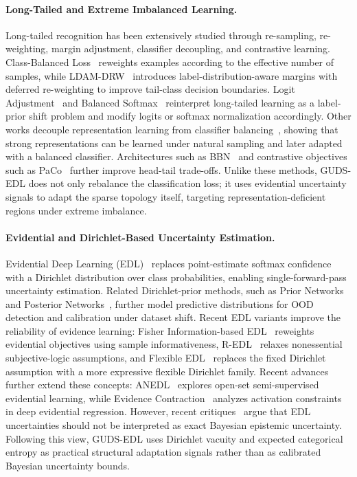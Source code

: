 \documentclass[letterpaper]{article} %
\begin{document}
\paragraph{Long-Tailed and Extreme Imbalanced Learning.} Long-tailed recognition has been extensively studied through re-sampling, re-weighting, margin adjustment, classifier decoupling, and contrastive learning. Class-Balanced Loss~\cite{cui2019class} reweights examples according to the effective number of samples, while LDAM-DRW~\cite{cao2019learning} introduces label-distribution-aware margins with deferred re-weighting to improve tail-class decision boundaries. Logit Adjustment~\cite{menon2021long} and Balanced Softmax~\cite{ren2020balanced} reinterpret long-tailed learning as a label-prior shift problem and modify logits or softmax normalization accordingly. Other works decouple representation learning from classifier balancing~\cite{kang2019decoupling}, showing that strong representations can be learned under natural sampling and later adapted with a balanced classifier. Architectures such as BBN~\cite{zhou2020bbn} and contrastive objectives such as PaCo~\cite{cui2021parametric} further improve head-tail trade-offs. Unlike these methods, GUDS-EDL does not only rebalance the classification loss; it uses evidential uncertainty signals to adapt the sparse topology itself, targeting representation-deficient regions under extreme imbalance.

\paragraph{Evidential and Dirichlet-Based Uncertainty Estimation.} Evidential Deep Learning (EDL)~\cite{sensoy2018evidential} replaces point-estimate softmax confidence with a Dirichlet distribution over class probabilities, enabling single-forward-pass uncertainty estimation. Related Dirichlet-prior methods, such as Prior Networks~\cite{malinin2018predictive} and Posterior Networks~\cite{charpentier2020posterior}, further model predictive distributions for OOD detection and calibration under dataset shift. Recent EDL variants improve the reliability of evidence learning: Fisher Information-based EDL~\cite{deng2023fisher} reweights evidential objectives using sample informativeness, R-EDL~\cite{chen2023redl} relaxes nonessential subjective-logic assumptions, and Flexible EDL~\cite{yoon2025flexible} replaces the fixed Dirichlet assumption with a more expressive flexible Dirichlet family. Recent advances further extend these concepts: ANEDL~\cite{yu2024anedl} explores open-set semi-supervised evidential learning, while Evidence Contraction~\cite{wu2024evidence} analyzes activation constraints in deep evidential regression. However, recent critiques~\cite{shen2024mirage} argue that EDL uncertainties should not be interpreted as exact Bayesian epistemic uncertainty. Following this view, GUDS-EDL uses Dirichlet vacuity and expected categorical entropy as practical structural adaptation signals rather than as calibrated Bayesian uncertainty bounds.
\end{document}
